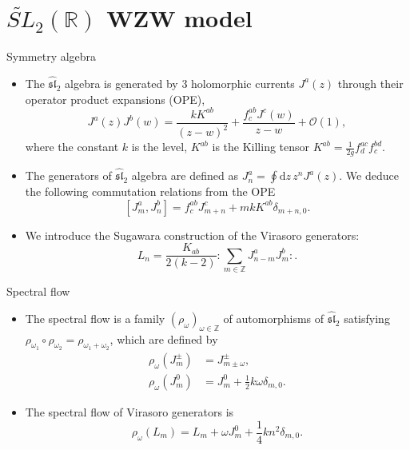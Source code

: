\documentclass{beamer}
\begin{document}
\section{\texorpdfstring{$\widetilde{SL}_{2}(\mathbb{R})$}{Lg} WZW model}

\begin{frame}{Symmetry algebra}
  \begin{itemize}
    \item The $\widehat{\mathfrak{sl}}_{2}$ algebra is generated by 3 holomorphic currents $J^{a}(z)$ through their operator product expansions (OPE), 
      \begin{equation}
        J^{a}(z)J^{b}(w) = \frac{kK^{ab}}{(z-w)^{2}} + \frac{f^{ab}_{c} J^{c}(w)}{z-w} + \mathcal{O}(1), \label{OPEJJ}
      \end{equation}
    where the constant $k$ is the level, $K^{ab}$ is the Killing tensor $K^{ab} = \frac{1}{2g} f^{ac}_{d}f^{bd}_{c}$.
    \item The generators of $\widehat{\mathfrak{sl}}_{2}$ algebra are defined as 
    $J^{a}_{n} = \oint \mathrm{d}z \, z^{n} J^{a}(z)$.
    We deduce the following commutation relations from the OPE
      \begin{equation}
          \left[ J^{a}_{m}, J^{b}_{n} \right] = f^{ab}_{c} J^{c}_{m+n} + m k K^{ab} \delta_{m+n,0}. 
      \end{equation}
    \item We introduce the Sugawara construction of the Virasoro generators:
      \begin{equation}
        L_{n} = \frac{K_{ab}}{2(k-2)} : \sum_{m \in \mathbb{Z} } J^{a}_{n-m} J^{b}_{m} :.
      \end{equation}
  \end{itemize}
\end{frame}

\begin{frame}{Spectral flow}
  \begin{itemize}
    \item The spectral flow is a family $(\rho_{\omega})_{\omega \in \mathbb{Z}}$ of automorphisms of $\widehat{\mathfrak{sl}}_{2}$
      satisfying $\rho_{\omega_{1}} \circ \rho_{\omega_{2}}  = \rho_{\omega_{1} + \omega_{2}}$, which are defined by 
      \begin{equation}
          \begin{aligned}
              \rho_{\omega}(J^{\pm}_{m}) & = J^{\pm}_{m \pm \omega},\\
              \rho_{\omega}(J^{0}_{m}) & = J^{0}_{m} + \frac{1}{2} k \omega \delta_{m,0}.
          \end{aligned}
      \end{equation}
    \item The spectral flow of Virasoro generators is 
      \begin{equation}
          \rho_{\omega}(L_{m}) = L_{m} + \omega J^{0}_{m} + \frac{1}{4} k n^{2} \delta_{m,0}.
      \end{equation}
  \end{itemize}
\end{frame}
\end{document}
